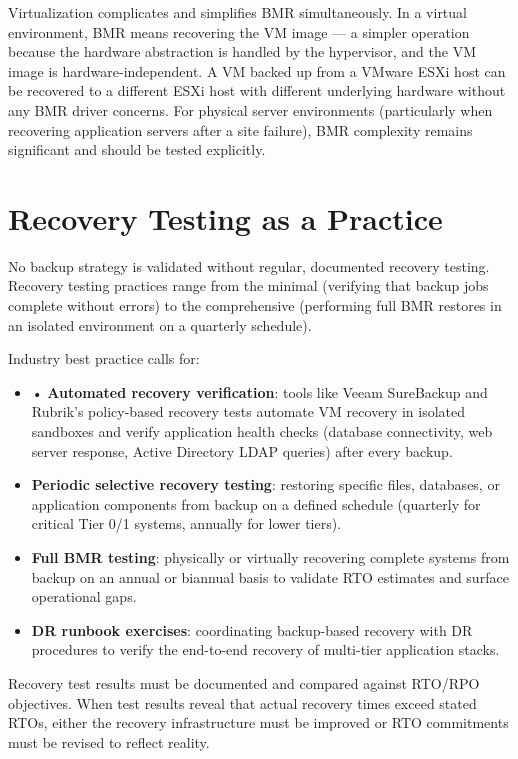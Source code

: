 Virtualization complicates and simplifies BMR simultaneously. In a virtual environment, BMR means recovering the VM image --- a simpler operation because the hardware abstraction is handled by the hypervisor, and the VM image is hardware-independent. A VM backed up from a VMware ESXi host can be recovered to a different ESXi host with different underlying hardware without any BMR driver concerns. For physical server environments (particularly when recovering application servers after a site failure), BMR complexity remains significant and should be tested explicitly.

\section{Recovery Testing as a Practice}
No backup strategy is validated without regular, documented recovery testing. Recovery testing practices range from the minimal (verifying that backup jobs complete without errors) to the comprehensive (performing full BMR restores in an isolated environment on a quarterly schedule).

Industry best practice calls for:

\begin{itemize}
  \item • \textbf{Automated recovery verification}: tools like Veeam SureBackup and Rubrik's policy-based recovery tests automate VM recovery in isolated sandboxes and verify application health checks (database connectivity, web server response, Active Directory LDAP queries) after every backup.
  \item \textbf{Periodic selective recovery testing}: restoring specific files, databases, or application components from backup on a defined schedule (quarterly for critical Tier 0/1 systems, annually for lower tiers).
  \item \textbf{Full BMR testing}: physically or virtually recovering complete systems from backup on an annual or biannual basis to validate RTO estimates and surface operational gaps.
  \item \textbf{DR runbook exercises}: coordinating backup-based recovery with DR procedures to verify the end-to-end recovery of multi-tier application stacks.
\end{itemize}

Recovery test results must be documented and compared against RTO/RPO objectives. When test results reveal that actual recovery times exceed stated RTOs, either the recovery infrastructure must be improved or RTO commitments must be revised to reflect reality.

